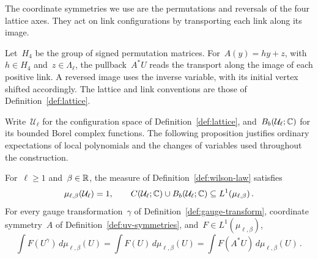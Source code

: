 The coordinate symmetries we use are the permutations and reversals of the four lattice axes.
They act on link configurations by transporting each link along its image.

\begin{definition}\label{def:uv-symmetries}
Let~$H_4$ be the group of signed permutation matrices.
For~$A(y)=hy+z$, with~$h\in H_4$ and~$z\in\Lambda_\ell$, the pullback~$A^*U$ reads the transport along the image of each positive link.
A reversed image uses the inverse variable, with its initial vertex shifted accordingly.
The lattice and link conventions are those of Definition~\ref{def:lattice}.
\end{definition}

Write~$\mathcal U_\ell$ for the configuration space of Definition~\ref{def:lattice}, and~$B_b(\mathcal U_\ell;\mathbb C)$ for its bounded Borel complex functions.
The following proposition justifies ordinary expectations of local polynomials and the changes of variables used throughout the construction.

\begin{proposition}\label{prop:uv-law}
For~$\ell\ge1$ and~$\beta\in\mathbb R$, the measure of Definition~\ref{def:wilson-law} satisfies
\begin{equation}\label{eq:uv-law}
 \mu_{\ell,\beta}(\mathcal U_\ell)=1,\qquad
 C(\mathcal U_\ell;\mathbb C)\cup B_b(\mathcal U_\ell;\mathbb C)
 \subseteq L^1(\mu_{\ell,\beta})\,.
\end{equation}
For every gauge transformation~$\gamma$ of Definition~\ref{def:gauge-transform}, coordinate symmetry~$A$ of Definition~\ref{def:uv-symmetries}, and~$F\in L^1(\mu_{\ell,\beta})$,
\begin{equation}\label{eq:uv-expectation-symmetry}
 \int F(U^\gamma)\,d\mu_{\ell,\beta}(U)
 =\int F(U)\,d\mu_{\ell,\beta}(U)
 =\int F(A^*U)\,d\mu_{\ell,\beta}(U)\,.
\end{equation}
\end{proposition}

